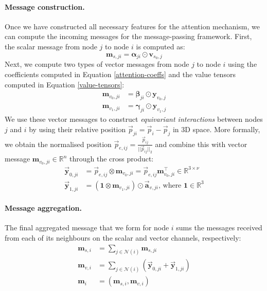 \paragraph{Message construction.}
Once we have constructed all necessary features for the attention mechanism, we can compute the incoming messages for the message-passing framework. First, the scalar message from node $j$ to node $i$ is computed as:
\begin{equation}
    \mathbf{m}_{s, ji} = \mathbf{\alpha}_{ji}\odot\mathbf{v}_{s_0, j}
\end{equation}
Next, we compute two types of vector messages from node $j$ to node $i$ using the coefficients computed in Equation \ref{attention-coeffs} and the value tensors computed in Equation \ref{value-tensors}:
\begin{align}
    \mathbf{m}_{v_0, ji} &= \mathbf{\beta}_{ji}\odot \mathbf{y}_{v_0, j}\\
    \mathbf{m}_{v_1, ji} &= \mathbf{\gamma}_{ji}\odot \mathbf{y}_{v_1, j}    
\end{align}
We use these vector messages to construct \textit{equivariant interactions} between nodes $j$ and $i$ by using their relative position $\vec{p}_{ji} = \vec{p}_i - \vec{p}_j$ in 3D space. More formally, we obtain the normalised position $\vec{p}_{e,ij} = \frac{\vec{p}_{ij}}{||\vec{p}_{ij}||_2}$ and combine this with vector message $\mathbf{m}_{v_0,ji}\in\mathbb{R}^n$ through the cross product:
\begin{align}
    \vec{\mathbf{y}}_{0, ji} &= \vec{p}_{e,ij}\otimes\mathbf{m}_{v_0,ji} = \vec{p}_{e,ij}\mathbf{m}_{v_0, ji}^{\top} \in \mathbb{R}^{3\times\nu}
\label{position-cross-product} \\
    \vec{\mathbf{y}}_{1, ji} &= (\mathbf{1}\otimes\mathbf{m}_{v_1, ji})\odot \vec{\mathbf{a}}_{v, ji}\text{, where }\mathbf{1}\in\mathbb{R}^3
\end{align}
\paragraph{Message aggregation.}
The final aggregated message that we form for node $i$ sums the messages received from each of its neighbours on the scalar and vector channels, respectively:
\begin{align}
    \mathbf{m}_{s, i} &= \sum_{j\in\mathcal{N}(i)}\mathbf{m}_{s, ji}\\
    \mathbf{m}_{v, i} &= \sum_{j\in\mathcal{N}(i)}(\vec{\mathbf{y}}_{0, ji} + \vec{\mathbf{y}}_{1, ji}) \\
    \mathbf{m}_i &= (\mathbf{m}_{s, i}, \mathbf{m}_{v, i})
\end{align}

